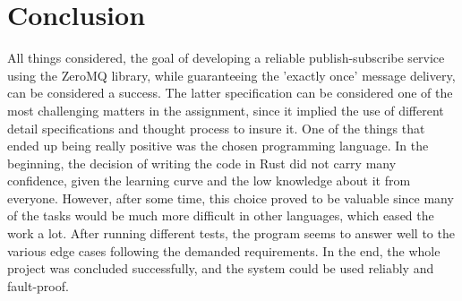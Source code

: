 \section{Conclusion}
\label{sec:Conclusion}

All things considered, the goal of developing a reliable publish-subscribe service using the ZeroMQ library, while guaranteeing the 'exactly once' message delivery, can be considered a success. The latter specification can be considered one of the most challenging matters in the assignment, since it implied the use of different detail specifications and thought process to insure it. One of the things that ended up being really positive was the chosen programming language. In the beginning, the decision of writing the code in Rust did not carry many confidence, given the learning curve and the low knowledge about it from everyone. However, after some time, this choice proved to be valuable since many of the tasks would be much more difficult in other languages, which eased the work a lot. After running different tests, the program seems to answer well to the various edge cases following the demanded requirements. In the end, the whole project was concluded successfully, and the system could be used reliably and fault-proof. 